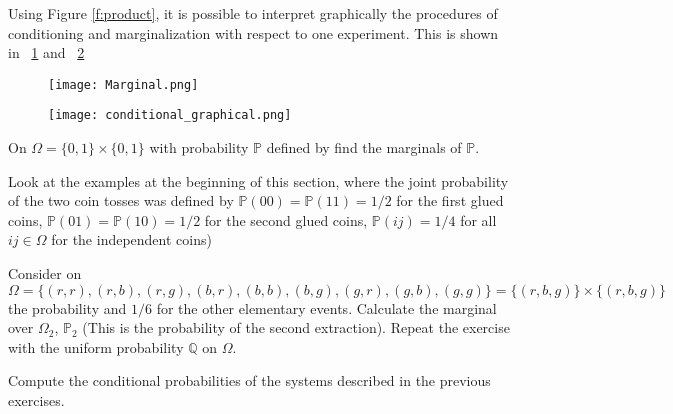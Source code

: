 Using Figure \eqref{f:product}, 
it is possible to interpret graphically the procedures of conditioning and marginalization with respect to one experiment. This is shown in ~\ref{f:marginal} and ~\ref{f:conditional}

\begin{figure}[h!]
\texttt{[image: Marginal.png]}
\label{f:marginal}
\end{figure}
\begin{figure}[h]
\texttt{[image: conditional\_graphical.png]}
\label{f:conditional}
\end{figure}

\begin{ExerciseList}

\Exercise
On $\Omega=\{0,1\}\times\{0,1\}$ with probability $\mathbb{P}$ defined by
find the marginals of $\mathbb{P}$.
    
\Exercise Look at the examples at the beginning of this section, where the joint probability of the two coin tosses was defined by 
$\mathbb{P}(00)=\mathbb{P}(11)=1/2$ for the first glued coins,  $\mathbb{P}(01)=\mathbb{P}(10)=1/2$ for the second glued coins, $\mathbb{P}(ij)= 1/4$ for all $ij\in\Omega$ for the independent coins)

\Exercise Consider on $\Omega=\{(r,r),(r,b),(r,g), (b,r),(b,b),(b,g),(g,r),(g,b),(g,g)\}=\{(r,b,g)\}\times\{(r,b,g)\}$ the probability 
 and $1/6$ for the other elementary events.  Calculate the marginal over $\Omega_2$, $\mathbb{P}_2$ (This is the probability of the second extraction).
Repeat the exercise with the uniform probability $\mathbb{Q}$ on $\Omega$.

\Exercise Compute the conditional probabilities of the systems described in the previous exercises. 

\end{ExerciseList}

